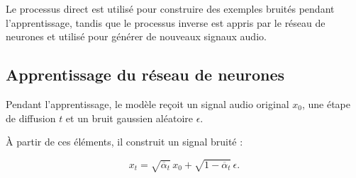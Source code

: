 \begin{center}
\end{center}

Le processus direct est utilisé pour construire des
exemples bruités pendant l'apprentissage, tandis que
le processus inverse est appris par le réseau de neurones
et utilisé pour générer de nouveaux signaux audio.

\subsection{Apprentissage du réseau de neurones}

Pendant l'apprentissage, le modèle reçoit un signal
audio original $x_0$, une étape de diffusion $t$ et
un bruit gaussien aléatoire $\epsilon$.

À partir de ces éléments, il construit un signal bruité :

\[
x_t =
\sqrt{\overline{\alpha}_t}\,x_0
+
\sqrt{1-\overline{\alpha}_t}\,\epsilon.
\]


